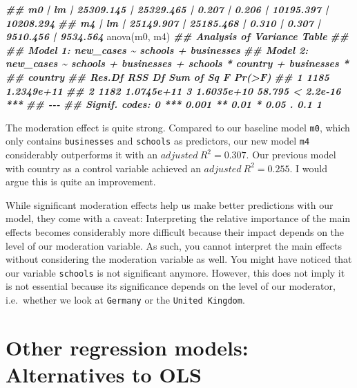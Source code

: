 \documentclass[
]{book}
\newenvironment{Shaded}{\begin{snugshade}}{\end{snugshade}}
\newcommand{\DocumentationTok}[1]{\textcolor[rgb]{0.56,0.35,0.01}{\textbf{\textit{#1}}}}
\newcommand{\FunctionTok}[1]{\textcolor[rgb]{0.00,0.00,0.00}{#1}}
\newcommand{\NormalTok}[1]{#1}
\begin{document}
\begin{Shaded}
\begin{Highlighting}[]
\DocumentationTok{\#\# m0   |    lm | 25309.145 | 25329.465 | 0.207 |     0.206 | 10195.397 | 10208.294}
\DocumentationTok{\#\# m4   |    lm | 25149.907 | 25185.468 | 0.310 |     0.307 |  9510.456 |  9534.564}
\FunctionTok{anova}\NormalTok{(m0, m4)}
\DocumentationTok{\#\# Analysis of Variance Table}
\DocumentationTok{\#\# }
\DocumentationTok{\#\# Model 1: new\_cases \textasciitilde{} schools + businesses}
\DocumentationTok{\#\# Model 2: new\_cases \textasciitilde{} schools + businesses + schools * country + businesses * }
\DocumentationTok{\#\#     country}
\DocumentationTok{\#\#   Res.Df        RSS Df  Sum of Sq      F    Pr(\textgreater{}F)    }
\DocumentationTok{\#\# 1   1185 1.2349e+11                                   }
\DocumentationTok{\#\# 2   1182 1.0745e+11  3 1.6035e+10 58.795 \textless{} 2.2e{-}16 ***}
\DocumentationTok{\#\# {-}{-}{-}}
\DocumentationTok{\#\# Signif. codes:  0 \textquotesingle{}***\textquotesingle{} 0.001 \textquotesingle{}**\textquotesingle{} 0.01 \textquotesingle{}*\textquotesingle{} 0.05 \textquotesingle{}.\textquotesingle{} 0.1 \textquotesingle{} \textquotesingle{} 1}
\end{Highlighting}
\end{Shaded}

The moderation effect is quite strong. Compared to our baseline model \texttt{m0}, which only contains \texttt{businesses} and \texttt{schools} as predictors, our new model \texttt{m4} considerably outperforms it with an \(adjusted\ R^2 = 0.307\). Our previous model with country as a control variable achieved an \(adjusted\ R^2 = 0.255\). I would argue this is quite an improvement.

While significant moderation effects help us make better predictions with our model, they come with a caveat: Interpreting the relative importance of the main effects becomes considerably more difficult because their impact depends on the level of our moderation variable. As such, you cannot interpret the main effects without considering the moderation variable as well. You might have noticed that our variable \texttt{schools} is not significant anymore. However, this does not imply it is not essential because its significance depends on the level of our moderator, i.e.~whether we look at \texttt{Germany} or the \texttt{United\ Kingdom}.

\hypertarget{other-regression-models-alternatives-to-ols}{%
\section{Other regression models: Alternatives to OLS}\label{other-regression-models-alternatives-to-ols}}
\end{document}
